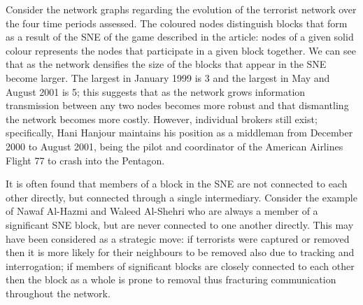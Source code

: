 Consider the network graphs regarding the evolution of the terrorist network over the four time periods assessed. The coloured nodes distinguish blocks that form as a result of the SNE of the game described in the article: nodes of a given solid colour represents the nodes that participate in a given block together. We can see that as the network densifies the size of the blocks that appear in the SNE become larger. The largest in January 1999 is 3 and the largest in May and August 2001 is 5; this suggests that as the network grows information transmission between any two nodes becomes more robust and that dismantling the network becomes more costly. However, individual brokers still exist; specifically, Hani Hanjour maintains his position as a middleman from December 2000 to August 2001, being the pilot and coordinator of the American Airlines Flight 77 to crash into the Pentagon.

It is often found that members of a block in the SNE are not connected to each other directly, but connected through a single intermediary. Consider the example of Nawaf Al-Hazmi and Waleed Al-Shehri who are always a member of a significant SNE block, but are never connected to one another directly. This may have been considered as a strategic move: if terrorists were captured or removed then it is more likely for their neighbours to be removed also due to tracking and interrogation; if members of significant blocks are closely connected to each other then the block as a whole is prone to removal thus fracturing communication throughout the network.

